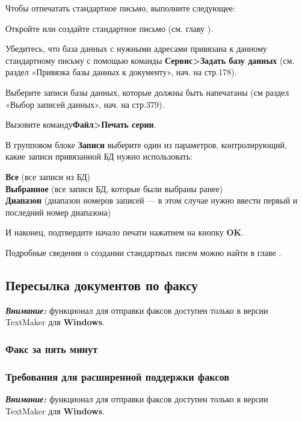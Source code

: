 ﻿\documentclass[a4paper,10pt]{article}
\newenvironment{myindentpar}[1]%
 {\begin{list}{}%
         {\setlength{\leftmargin}{#1}}%
         \item[]%
 }
 {\end{list}}
\begin{document}
Чтобы отпечатать стандартное письмо, выполните следующее:
\begin{enumerate}
 \item Откройте или создайте стандартное письмо (см. главу ).
 \item Убедитесь, что база данных с нужными адресами привязана к данному стандартному письму с помощью команды \textbf{Сервис>Задать базу данных} (см. раздел «Привязка базы данных к документу», нач. на стр.178).
 \item Выберите записи базы данных, которые должны быть напечатаны (см раздел «Выбор записей данных», нач. на стр.379).
 \item Вызовите команду\textbf{Файл>Печать серии}.
 \item В групповом блоке \textbf{Записи} выберите один из параметров, контролирующий, какие записи привязанной БД нужно использовать:
 \begin{myindentpar}{2cm}
 \textbf{Все} (все записи из БД)\\
 \textbf{Выбранное} (все записи БД, которые были выбраны ранее)\\
 \textbf{Диапазон} (диапазон номеров записей — в этом случае нужно ввести первый и последний номер диапазона)
 \end{myindentpar}
\end{enumerate}

И наконец, подтвердите начало печати нажатием на кнопку \textbf{OK}.

Подробные сведения о создании стандартных писем можно найти в главе .

\subsection{Пересылка документов по факсу}
\begin{mdframed}[backgroundcolor=blue!10]
\textbf{\textit{Внимание:}} функционал для отправки факсов доступен только в версии TextMaker для \textbf{Windows}.
\end{mdframed}
\subsubsection{Факс за пять минут}
\subsubsection{Требования для расширенной поддержки факсов}
\begin{mdframed}[backgroundcolor=blue!10]
\textbf{\textit{Внимание:}} функционал для отправки факсов доступен только в версии TextMaker для \textbf{Windows}.
\end{mdframed}
\end{document}
